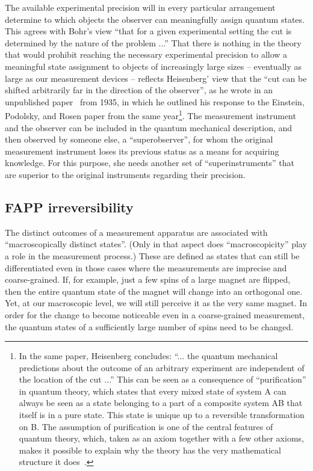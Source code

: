 \documentclass[12pt,a4]{article}
\begin{document}
The available experimental precision will in every particular arrangement determine to which objects the observer can meaningfully assign quantum states. This agrees with Bohr's view ``that for a given experimental setting the cut is determined by the nature of the problem ...'' That there is nothing in the theory that would prohibit reaching the necessary experimental precision to allow a meaningful state assignment to objects of increasingly large sizes -- eventually as large as our measurement devices -- reflects Heisenberg' view that the ``cut can be shifted arbitrarily far in the direction of the observer'', as he wrote in an unpublished paper~\cite{heisenberg} from 1935, in which he outlined his response to the Einstein, Podolsky, and Rosen paper from the same year\footnote{In the same paper, Heisenberg concludes: ``... the quantum mechanical predictions about the outcome of an arbitrary experiment are independent of the location of the cut ...'' This can be seen as a consequence of ``purification'' in quantum theory, which states that every mixed state of system A can always be seen as a state belonging to a part of a composite system AB that itself is in a pure state. This state is unique up to a reversible transformation on B. The assumption of purification is one of the central features of quantum theory, which, taken as an axiom together with a few other axioms, makes it possible to explain why the theory has the very mathematical structure it does~\cite{chiribella}.}. The measurement instrument and the observer can be included in the quantum mechanical description, and then observed by someone else, a ``superobserver'', for whom the original measurement instrument loses its previous status as a means for acquiring knowledge. For this purpose, she needs another set of ``superinstruments'' that are superior to the original instruments regarding their precision. 

\subsection*{FAPP  irreversibility}
 
The distinct outcomes of a measurement apparatus are associated with ``macroscopically distinct states''. (Only in that aspect does ``macroscopicity'' play a role in the measurement process.) These are defined as states that can still be differentiated even in those cases where the measurements are imprecise and coarse-grained. If, for example, just a few spins of a large magnet are flipped, then the entire quantum state of the magnet will change into an orthogonal one. Yet, at our macroscopic level, we will still perceive it as the very same magnet. In order for the change to become noticeable even in a coarse-grained measurement, the quantum states of a sufficiently large number of spins need to be changed.   
\end{document}
